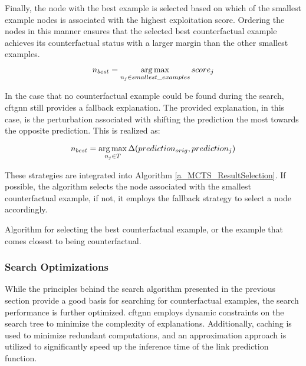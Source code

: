 Finally, the node with the best example is selected based on which of the smallest example nodes is associated with the highest exploitation score. Ordering the nodes in this manner ensures that the selected best counterfactual example achieves its counterfactual status with a larger margin than the other smallest examples.

\begin{equation}
    n_{best} = \operatorname*{arg\,max}_{n_j \in smallest\_examples} score_j
\end{equation}

In the case that no counterfactual example could be found during the search, \gls{cftgnn} still provides a fallback explanation. The provided explanation, in this case, is the perturbation associated with shifting the prediction the most towards the opposite prediction. This is realized as:

\begin{equation}
    n_{best} = \operatorname*{arg\,max}_{n_j \in T} \Delta(prediction_{orig}, prediction_j)
\end{equation}

These strategies are integrated into Algorithm \ref{a_MCTS_ResultSelection}. If possible, the algorithm selects the node associated with the smallest counterfactual example, if not, it employs the fallback strategy to select a node accordingly.

{
\setlength{\algomargin}{1.25em}
\small
\begin{algorithm}[ht]
\caption{Algorithm for selecting the best counterfactual example, or the example that comes closest to being counterfactual.}
\label{a_MCTS_ResultSelection}
\end{algorithm}
}


\subsubsection{Search Optimizations}
\label{s_Methodology_Search_Optimizations}
 While the principles behind the search algorithm presented in the previous section provide a good basis for searching for counterfactual examples, the search performance is further optimized. \gls{cftgnn} employs dynamic constraints on the search tree to minimize the complexity of explanations. Additionally, caching is used to minimize redundant computations, and an approximation approach is utilized to significantly speed up the inference time of the link prediction function.

